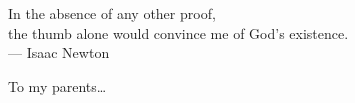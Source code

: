 \cleardoublepage
\thispagestyle{empty}


\vspace*{3cm}

\begin{raggedleft}
    	In the absence of any other proof, \\
	the thumb alone would convince me of God's existence.\\
     --- Isaac Newton\\
\end{raggedleft}

\vspace{4cm}

\begin{center}
    To my parents\dots
\end{center}


